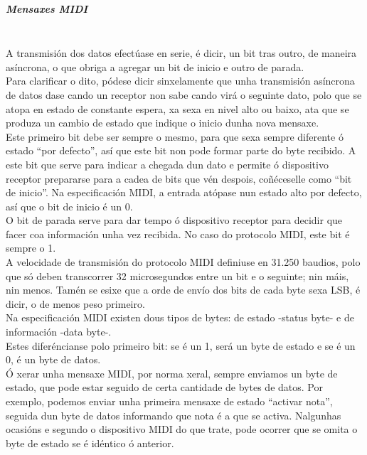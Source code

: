     \subparagraph{Mensaxes MIDI}\mbox{}\\

    A transmisión dos datos efectúase en serie, é dicir, un bit tras outro, de
    maneira asíncrona, o que obriga a agregar un bit de inicio e outro de
    parada. \\
  
    Para clarificar o dito, pódese dicir sinxelamente que unha transmisión
    asíncrona de datos dase cando un receptor non sabe cando virá o seguinte
    dato, polo que se atopa en estado de constante espera, xa sexa en nivel
    alto ou baixo, ata que se produza un cambio de estado que indique o inicio
    dunha nova mensaxe. \\

    Este primeiro bit debe ser sempre o mesmo, para que sexa sempre diferente ó
    estado ``por defecto'', así que este bit non pode formar parte do byte
    recibido. A este bit que serve para indicar a chegada dun dato e permite ó
    dispositivo receptor prepararse para a cadea de bits que vén despois,
    coñéceselle como ``bit de inicio''. Na especificación MIDI, a entrada
    atópase nun estado alto por defecto, así que o bit de inicio é un 0. \\

    O bit de parada serve para dar tempo ó dispositivo receptor para decidir
    que facer coa información unha vez recibida. No caso do protocolo MIDI,
    este bit é sempre o 1. \\

    A velocidade de transmisión do protocolo MIDI definiuse en 31.250 baudios,
    polo que só deben transcorrer 32 microsegundos entre un bit e o seguinte;
    nin máis, nin menos. Tamén se esixe que a orde de envío dos bits de cada
    byte sexa LSB, é dicir, o de menos peso primeiro. \\

    Na especificación MIDI existen dous tipos de bytes: de estado -status byte-
    e de información -data byte-. \\

    Estes diferéncianse polo primeiro bit: se é un 1, será un byte de estado e
    se é un 0, é un byte de datos. \\

    Ó xerar unha mensaxe MIDI, por norma xeral, sempre enviamos un byte de
    estado, que pode estar seguido de certa cantidade de bytes de datos. Por
    exemplo, podemos enviar unha primeira mensaxe de estado ``activar nota'',
    seguida dun byte de datos informando que nota é a que se activa. Nalgunhas
    ocasións e segundo o dispositivo MIDI do que trate, pode ocorrer que se
    omita o byte de estado se é idéntico ó anterior. \\

